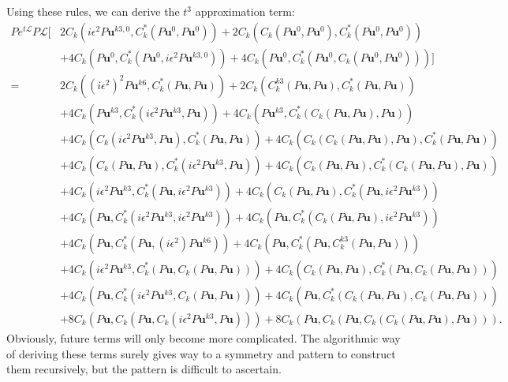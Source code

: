 \documentclass{article}
\begin{document}
Using these rules, we can derive the $t^3$ approximation term:
\begin{align*}
Pe^{t\mathcal{L}}P\mathcal{L}\bigg[&2C_k(i\epsilon^2P\mathbf{u}^{k3,0},C_k^*(P\mathbf{u}^0,P\mathbf{u}^0))+2C_k(C_k(P\mathbf{u}^0,P\mathbf{u}^0),C_k^*(P\mathbf{u}^0,P\mathbf{u}^0))\\
&+4C_k(P\mathbf{u}^0,C_k^*(P\mathbf{u}^0,i\epsilon^2 P \mathbf{u}^{k3,0}))+4C_k(P\mathbf{u}^0,C_k^*(P\mathbf{u}^0,C_k(P\mathbf{u}^0,P\mathbf{u}^0)))\bigg]\\
=&2C_k((i\epsilon^2)^2P\mathbf{u}^{k6},C_k^*(P\mathbf{u},P\mathbf{u})) + 2C_k(C_k^{k3}(P\mathbf{u},P\mathbf{u}),C_k^*(P\mathbf{u},P\mathbf{u}))\\
&+4C_k(P\mathbf{u}^{k3},C_k^*(i\epsilon^2P\mathbf{u}^{k3},P\mathbf{u}))+4C_k(P\mathbf{u}^{k3},C_k^*(C_k(P\mathbf{u},P\mathbf{u}),P\mathbf{u}))\\
&+4C_k(C_k(i\epsilon^2P\mathbf{u}^{k3},P\mathbf{u}),C_k^*(P\mathbf{u},P\mathbf{u}))+4C_k(C_k(C_k(P\mathbf{u},P\mathbf{u}),P\mathbf{u}),C_k^*(P\mathbf{u},P\mathbf{u}))\\
&+4C_k(C_k(P\mathbf{u},P\mathbf{u}),C_k^*(i\epsilon^2P\mathbf{u}^{k3},P\mathbf{u}))+4C_k(C_k(P\mathbf{u},P\mathbf{u}),C_k^*(C_k(P\mathbf{u},P\mathbf{u}),P\mathbf{u}))\\
&+4C_k(i\epsilon^2 P \mathbf{u}^{k3},C_k^*(P\mathbf{u},i\epsilon^2 P \mathbf{u}^{k3}))+4C_k(C_k(P\mathbf{u},P\mathbf{u}),C_k^*(P\mathbf{u},i\epsilon^2 P \mathbf{u}^{k3}))\\
&+4C_k(P \mathbf{u},C_k^*(i\epsilon^2P\mathbf{u}^{k3},i\epsilon^2 P \mathbf{u}^{k3}))
+4C_k(P \mathbf{u},C_k^*(C_k(P\mathbf{u},P\mathbf{u}),i\epsilon^2 P \mathbf{u}^{k3}))\\
&+4C_k(P\mathbf{u},C_k^*(P\mathbf{u},(i\epsilon^2) P \mathbf{u}^{k6})) 
+4C_k(P\mathbf{u},C_k^*(P\mathbf{u},C_k^{k3}(P\mathbf{u},P\mathbf{u})))\\
&+4C_k(i\epsilon^2 P \mathbf{u}^{k3},C_k^*(P\mathbf{u},C_k(P\mathbf{u},P\mathbf{u})))
+4C_k(C_k(P\mathbf{u},P\mathbf{u}),C_k^*(P\mathbf{u},C_k(P\mathbf{u},P\mathbf{u})))\\
&+4C_k(P\mathbf{u},C_k^*(i\epsilon^2 P \mathbf{u}^{k3},C_k(P\mathbf{u},P\mathbf{u})))
+4C_k(P\mathbf{u},C_k^*(C_k(P\mathbf{u},P\mathbf{u}),C_k(P\mathbf{u},P\mathbf{u})))\\
&+8C_k(P\mathbf{u},C_k(P\mathbf{u},C_k(i\epsilon^2 P\mathbf{u}^{k3},P\mathbf{u})))
+8C_k(P\mathbf{u},C_k(P\mathbf{u},C_k(C_k(P\mathbf{u},P\mathbf{u}),P\mathbf{u}))).
\end{align*}Obviously, future terms will only become more complicated. The algorithmic way of deriving these terms surely gives way to a symmetry and pattern to construct them recursively, but the pattern is difficult to ascertain.
\end{document}
